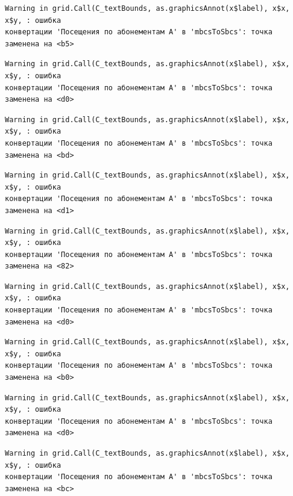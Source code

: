 \documentclass[
  letterpaper,
  DIV=11,
  numbers=noendperiod]{scrreprt}
\begin{document}
\begin{verbatim}
Warning in grid.Call(C_textBounds, as.graphicsAnnot(x$label), x$x, x$y, : ошибка
конвертации 'Посещения по абонементам А' в 'mbcsToSbcs': точка заменена на <b5>
\end{verbatim}

\begin{verbatim}
Warning in grid.Call(C_textBounds, as.graphicsAnnot(x$label), x$x, x$y, : ошибка
конвертации 'Посещения по абонементам А' в 'mbcsToSbcs': точка заменена на <d0>
\end{verbatim}

\begin{verbatim}
Warning in grid.Call(C_textBounds, as.graphicsAnnot(x$label), x$x, x$y, : ошибка
конвертации 'Посещения по абонементам А' в 'mbcsToSbcs': точка заменена на <bd>
\end{verbatim}

\begin{verbatim}
Warning in grid.Call(C_textBounds, as.graphicsAnnot(x$label), x$x, x$y, : ошибка
конвертации 'Посещения по абонементам А' в 'mbcsToSbcs': точка заменена на <d1>
\end{verbatim}

\begin{verbatim}
Warning in grid.Call(C_textBounds, as.graphicsAnnot(x$label), x$x, x$y, : ошибка
конвертации 'Посещения по абонементам А' в 'mbcsToSbcs': точка заменена на <82>
\end{verbatim}

\begin{verbatim}
Warning in grid.Call(C_textBounds, as.graphicsAnnot(x$label), x$x, x$y, : ошибка
конвертации 'Посещения по абонементам А' в 'mbcsToSbcs': точка заменена на <d0>
\end{verbatim}

\begin{verbatim}
Warning in grid.Call(C_textBounds, as.graphicsAnnot(x$label), x$x, x$y, : ошибка
конвертации 'Посещения по абонементам А' в 'mbcsToSbcs': точка заменена на <b0>
\end{verbatim}

\begin{verbatim}
Warning in grid.Call(C_textBounds, as.graphicsAnnot(x$label), x$x, x$y, : ошибка
конвертации 'Посещения по абонементам А' в 'mbcsToSbcs': точка заменена на <d0>
\end{verbatim}

\begin{verbatim}
Warning in grid.Call(C_textBounds, as.graphicsAnnot(x$label), x$x, x$y, : ошибка
конвертации 'Посещения по абонементам А' в 'mbcsToSbcs': точка заменена на <bc>
\end{verbatim}
\end{document}
